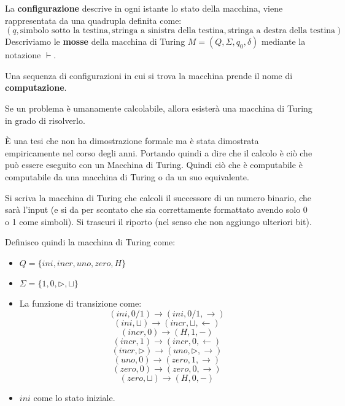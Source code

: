 La \textbf{configurazione} descrive in ogni istante lo stato della macchina, 
viene rappresentata da una quadrupla definita come:
\begin{equation}
    (q, \text{simbolo sotto la testina}, \text{stringa a sinistra della testina}, \text{stringa a destra della testina})
\end{equation}
Descriviamo le \textbf{mosse} della macchina di Turing $M = (Q, \Sigma, q_0, \delta)$ 
mediante la notazione $\vdash$. 
\begin{definizione}
    Una sequenza di configurazioni in cui si trova la macchina prende il nome di 
    \textbf{computazione}.
\end{definizione}
\begin{teorema}
    Se un problema è umanamente calcolabile, allora esisterà una macchina di
     Turing in grado di risolverlo.
\end{teorema}
È una tesi che non ha dimostrazione formale ma è stata dimostrata empiricamente 
nel corso degli anni. Portando quindi a dire che il calcolo è ciò che può essere 
eseguito con un Macchina di Turing. Quindi ciò che è computabile è computabile da 
una macchina di Turing o da un suo equivalente.

\begin{esempio} 
    Si scriva la macchina di Turing che calcoli il successore di un numero binario, 
    che sarà l'input (e si da per scontato che sia correttamente formattato avendo 
    solo 0 o 1 come simboli). Si trascuri il riporto (nel senso che non aggiungo ulteriori bit).
    
    Definisco quindi la macchina di Turing come:
    \begin{itemize}
        \item $Q = \{ini, incr, uno, zero, H\}$
        \item $\Sigma = \{1, 0, \triangleright, \sqcup\}$
        \item La funzione di transizione come: 
        $$(ini, 0 / 1) \to (ini, 0 / 1, \to)$$ 
        $$(ini, \sqcup) \to (incr, \sqcup, \gets)$$ 
        $$(incr, 0) \to (H, 1, -)$$ 
        $$(incr, 1) \to (incr, 0, \gets)$$ 
        $$(incr, \triangleright) \to (uno, \triangleright, \to)$$ 
        $$(uno, 0) \to (zero, 1, \to)$$
        $$(zero, 0) \to (zero, 0, \to)$$
        $$(zero, \sqcup) \to (H, 0, -)$$
        \item $ini$ come lo stato iniziale.
    \end{itemize}
\end{esempio}

